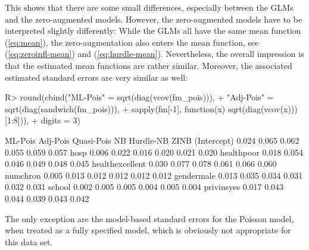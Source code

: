 \documentclass{Z}
\begin{document}
This shows that there are some small differences, especially between the GLMs and the
zero-augmented models. However, the zero-augmented models have to be interpreted 
slightly differently: While the GLMs all have the same mean function (\ref{eq:mean}),
the zero-augmentation also enters the mean function, see (\ref{eq:zeroinfl-mean}) and
(\ref{eq:hurdle-mean}). Nevertheless,
the overall impression is that the estimated mean functions are rather similar.
Moreover, the associated estimated standard errors
are very similar as well:
\begin{Schunk}
\begin{Sinput}
R> round(cbind("ML-Pois" = sqrt(diag(vcov(fm_pois))),
+   "Adj-Pois" = sqrt(diag(sandwich(fm_pois))),
+   sapply(fm[-1], function(x) sqrt(diag(vcov(x)))[1:8])),
+   digits = 3)
\end{Sinput}
\begin{Soutput}
                ML-Pois Adj-Pois Quasi-Pois    NB Hurdle-NB  ZINB
(Intercept)       0.024    0.065      0.062 0.055     0.059 0.057
hosp              0.006    0.022      0.016 0.020     0.021 0.020
healthpoor        0.018    0.054      0.046 0.049     0.048 0.045
healthexcellent   0.030    0.077      0.078 0.061     0.066 0.060
numchron          0.005    0.013      0.012 0.012     0.012 0.012
gendermale        0.013    0.035      0.034 0.031     0.032 0.031
school            0.002    0.005      0.005 0.004     0.005 0.004
privinsyes        0.017    0.043      0.044 0.039     0.043 0.042
\end{Soutput}
\end{Schunk}
The only exception are the model-based standard errors for the Poisson model,
when treated as a fully specified model, which is obviously not appropriate for this data set.
\end{document}
